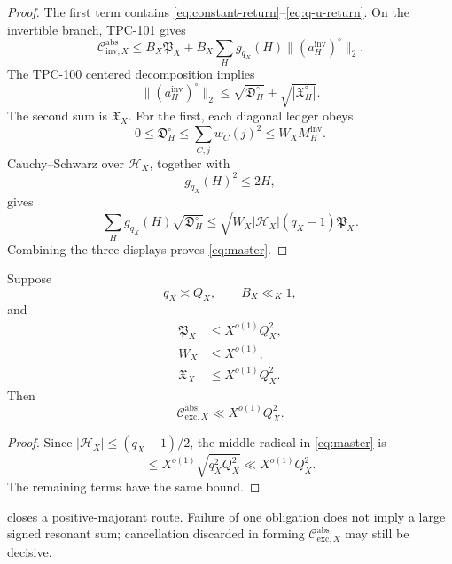 \begin{proof}
The first term contains
\eqref{eq:constant-return}--\eqref{eq:q-u-return}.  On the
invertible branch, TPC-101 gives
\[
 \mathcal C_{\mathrm{inv},X}^{\mathrm{abs}}
 \le
 B_X\mathfrak P_X
 +
 B_X\sum_Hg_{q_X}(H)
 \|(a_H^{\mathrm{inv}})^\circ\|_2.
\]
The TPC-100 centered decomposition implies
\[
 \|(a_H^{\mathrm{inv}})^\circ\|_2
 \le
 \sqrt{\mathfrak D_H^\circ}
 +
 \sqrt{|\mathfrak X_H^\circ|}.
\]
The second sum is \(\mathfrak X_X\).  For the first, each diagonal
ledger obeys
\[
 0\le\mathfrak D_H^\circ
 \le\sum_{C,j}w_C(j)^2
 \le W_XM_H^{\mathrm{inv}}.
\]
Cauchy--Schwarz over \(\mathcal H_X\), together with
\[
 g_{q_X}(H)^2\le2H,
\]
gives
\[
 \sum_Hg_{q_X}(H)\sqrt{\mathfrak D_H^\circ}
 \le
 \sqrt{
 W_X|\mathcal H_X|(q_X-1)\mathfrak P_X}.
\]
Combining the three displays proves \eqref{eq:master}.
\end{proof}

\begin{corollary}
\label{cor:positive-closure}
Suppose
\[
 q_X\asymp Q_X,\qquad B_X\ll_K1,
\]
and
\begin{align}
 \mathfrak P_X&\le X^{o(1)}Q_X^2,
\label{eq:principal-obligation}\\
 W_X&\le X^{o(1)},
\label{eq:atom-obligation}\\
 \mathfrak X_X&\le X^{o(1)}Q_X^2.
\label{eq:cross-obligation}
\end{align}
Then
\[
 \mathcal C_{\mathrm{exc},X}^{\mathrm{abs}}
 \ll X^{o(1)}Q_X^2.
\]
\end{corollary}

\begin{proof}
Since
\(|\mathcal H_X|\le(q_X-1)/2\), the middle radical in
\eqref{eq:master} is
\[
 \le
 X^{o(1)}
 \sqrt{q_X^2Q_X^2}
 \ll X^{o(1)}Q_X^2.
\]
The remaining terms have the same bound.
\end{proof}

\begin{remark}
 closes a positive-majorant route.
Failure of one obligation does not imply a large signed resonant
sum; cancellation discarded in forming
\(\mathcal C_{\mathrm{exc},X}^{\mathrm{abs}}\) may still be decisive.
\end{remark}
